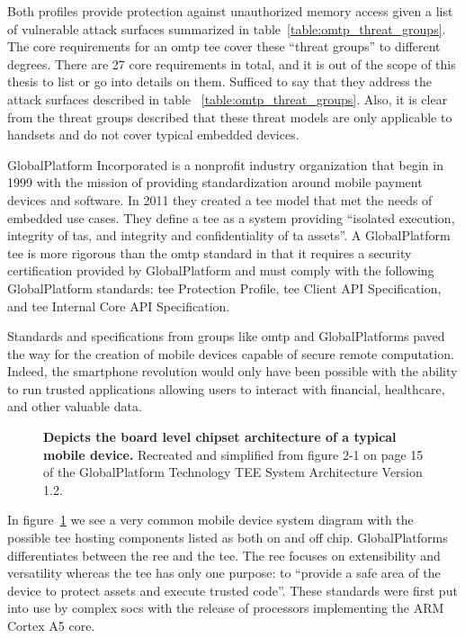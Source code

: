 \renewcommand{\arraystretch}{2}


Both profiles provide protection against unauthorized memory access given a list of vulnerable attack surfaces summarized in table~\ref{table:omtp_threat_groups}. The core requirements for an \gls{omtp} \gls{tee} cover these ``threat groups'' to different degrees. There are 27 core requirements in total, and it is out of the scope of this thesis to list or go into details on them. Sufficed to say that they address the attack surfaces described in table ~\ref{table:omtp_threat_groups}. Also, it is clear from the threat groups described that these threat models are only applicable to handsets and do not cover typical embedded devices. 

GlobalPlatform Incorporated is a nonprofit industry organization that begin in 1999 with the mission of providing standardization around mobile payment devices and software. In 2011 they created a \gls{tee} model \cite{GlobalPlatform2018} that met the needs of embedded use cases. They define a \gls{tee} as a system providing ``isolated execution, integrity of \glspl{ta}, and integrity and confidentiality of \gls{ta} assets''. \cite{GlobalPlatform2018} A GlobalPlatform \gls{tee} is more rigorous than the \gls{omtp} standard in that it requires a security certification provided by GlobalPlatform and must comply with the following GlobalPlatform standards: \gls{tee} Protection Profile, \gls{tee} Client API Specification, and \gls{tee} Internal Core API Specification. \cite{GPD2}\cite{GPD3}\cite{GPD4}

Standards and specifications from groups like \gls{omtp} and GlobalPlatforms paved the way for the creation of mobile devices capable of secure remote computation. Indeed, the smartphone revolution would only have been possible with the ability to run trusted applications allowing users to interact with financial, healthcare, and other valuable data.

\begin{figure}[htbp]
\centering

\caption[GlobalPlatforms Typical Chipset Architecture]{\textbf{Depicts the board level chipset architecture of a typical mobile device.} Recreated and simplified from figure 2-1 on page 15 of the GlobalPlatform Technology TEE System Architecture Version 1.2. \cite{GlobalPlatform2018}}
\label{fig:gpd-tee}
\end{figure}

In figure~\ref{fig:gpd-tee} we see a very common mobile device system diagram with the possible \gls{tee} hosting components listed as both on and off chip. GlobalPlatforms differentiates between the \gls{ree} and the \gls{tee}. The \gls{ree} focuses on extensibility and versatility whereas the \gls{tee} has only one purpose: to ``provide a safe area of the device to protect assets and execute trusted code''. \cite{GlobalPlatform2018} These standards were first put into use by complex \glspl{soc} with the release of processors implementing the ARM Cortex A5 core.

